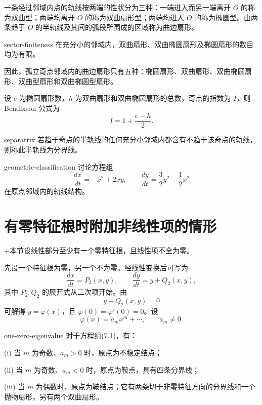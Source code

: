 
一条经过邻域内点的轨线按两端的性状分为三种：一端进入而另一端离开 $O$ 的称为双曲型；两端均离开 $O$ 的称为双曲扇形型；两端均进入 $O$ 的称为椭圆型。由两条趋于 $O$ 的半轨线及其间的弧段所围成的区域称为曲边扇形。


\begin{theorem}{}{sector-finiteness}
在充分小的邻域内，双曲扇形、双曲椭圆扇形及椭圆扇形的数目均为有限。
\end{theorem}

因此，孤立奇点邻域内的曲边扇形只有五种：椭圆扇形、双曲扇形、双曲椭圆扇形、双曲型扇形和双曲椭圆型扇形。


设 $e$ 为椭圆扇形数，$h$ 为双曲扇形和双曲椭圆扇形的总数，奇点的指数为 $I$，则 Bendixson 公式为
\[
I=1+\dfrac{e-h}{2}.
\]

\begin{definition}{}{separatrix}
若趋于奇点的半轨线的任何充分小邻域内都含有不趋于该奇点的轨线，则称此半轨线为分界线。
\end{definition}

\begin{example}{}{geometric-classification}
讨论方程组
\[
\dfrac{dx}{dt}=-x^2+2xy,\qquad
\dfrac{dy}{dt}=\dfrac32y^2-\dfrac12x^2
\]
在原点邻域内的轨线结构。
\end{example}

\section{有零特征根时附加非线性项的情形}
+本节设线性部分至少有一个零特征根，且线性项不全为零。

先设一个特征根为零，另一个不为零。经线性变换后可写为
\[
\dfrac{dx}{dt}=P_2(x,y),\qquad
\dfrac{dy}{dt}=y+Q_2(x,y),
\tag{7.1}
\]
其中 $P_2,Q_2$ 的展开式从二次项开始。由
\[
y+Q_2(x,y)=0
\]
可解得 $y=\varphi(x)$，且 $\varphi(0)=\varphi'(0)=0$。设
\[
\varphi(x)=a_mx^m+\cdots,\qquad a_m\ne0.
\]

\begin{theorem}{}{one-zero-eigenvalue}
对于方程组(7.1)，有：

\noindent (i) 当 $m$ 为奇数、$a_m>0$ 时，原点为不稳定结点；

\noindent (ii) 当 $m$ 为奇数、$a_m<0$ 时，原点为鞍点，具有四条分界线；

\noindent (iii) 当 $m$ 为偶数时，原点为鞍结点；它有两条切于非零特征方向的分界线和一个抛物扇形，另有两个双曲扇形。
\end{theorem}

